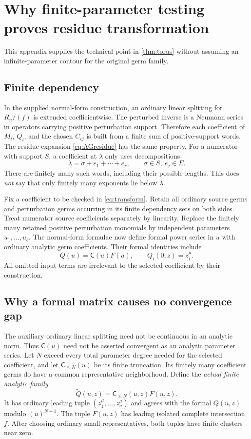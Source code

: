 \documentclass[11pt,letterpaper]{article}
\theoremstyle{definition}
\theoremstyle{remark}
\numberwithin{equation}{section}
\begin{document}
\appendix
\section{Why finite-parameter testing proves residue transformation}\label{app:transform}
This appendix supplies the technical point in \cref{thm:torus} without assuming an infinite-parameter contour for the original germ family.

\subsection{Finite dependency}
In the supplied normal-form construction, an ordinary linear splitting for $R_n/(f)$ is extended coefficientwise. The perturbed inverse is a Neumann series in operators carrying positive perturbation support. Therefore each coefficient of $M_i$, $Q_i$, and the chosen $C_{ij}$ is built from a finite sum of positive-support words. The residue expansion \eqref{eq:AGresidue} has the same property. For a numerator with support $S$, a coefficient at $\lambda$ only uses decompositions
\[
\lambda=\sigma+e_1+\cdots+e_r,\qquad \sigma\in S,\ e_j\in E.
\]
There are finitely many such words, including their possible lengths. This does \emph{not} say that only finitely many exponents lie below $\lambda$.

Fix a coefficient to be checked in \eqref{eq:transform}. Retain all ordinary source germs and perturbation germs occurring in its finite dependency sets on both sides. Treat numerator source coefficients separately by linearity. Replace the finitely many retained positive perturbation monomials by independent parameters $u_1,\ldots,u_b$. The normal-form formulae now define formal power series in $u$ with ordinary analytic germ coefficients. Their formal identities include
\[
Q(u)=\mathsf C(u)F(u),\qquad Q_i(0,z)=z_i^\mu.
\]
All omitted input terms are irrelevant to the selected coefficient by their construction.

\subsection{Why a formal matrix causes no convergence gap}
The auxiliary ordinary linear splitting need not be continuous in an analytic norm. Thus $\mathsf C(u)$ need not be asserted convergent as an analytic parameter series. Let $N$ exceed every total parameter degree needed for the selected coefficient, and let $\mathsf C_{\le N}(u)$ be its finite truncation. Its finitely many coefficient germs do have a common representative neighborhood. Define the \emph{actual finite analytic family}
\[
\widetilde Q(u,z)=\mathsf C_{\le N}(u,z)F(u,z).
\]
It has ordinary leading tuple $(z_1^\mu,\ldots,z_n^\mu)$ and agrees with the formal $Q(u,z)$ modulo $(u)^{N+1}$. The tuple $F(u,z)$ has leading isolated complete intersection $f$. After choosing ordinary small representatives, both tuples have finite clusters near zero.
\end{document}
